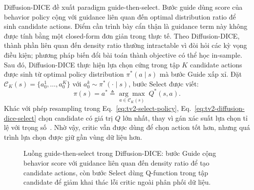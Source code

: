 Diffusion-DICE đề xuất paradigm guide-then-select.
Bước guide dùng score của behavior policy cộng với guidance liên quan đến optimal distribution ratio để sinh candidate actions.
Điểm cần trình bày cẩn thận là guidance term này không được tính bằng một closed-form đơn giản trong thực tế.
Theo Diffusion-DICE, thành phần liên quan đến density ratio thường intractable vì đòi hỏi các kỳ vọng điều kiện; phương pháp biến đổi bài toán thành objective có thể học in-sample.
Sau đó, Diffusion-DICE thực hiện lựa chọn cứng trong tập $K$ candidate actions được sinh từ optimal policy distribution $\pi^*(a\mid s)$ mà bước Guide xấp xỉ.
Đặt $\mathcal{C}_K(s)=\{a_0^1,\ldots,a_0^K\}$ với $a_0^k\sim\pi^*(\cdot\mid s)$, bước Select được viết:
\begin{equation}
    \pi(s)
    =
    a^*
    \triangleq
    \underset{a\in\mathcal{C}_K(s)}{\arg\max}
    \;Q^*(s,a).
    \label{eq:tv2-diffusion-dice-select}
\end{equation}
Khác với phép resampling trong Eq.~\eqref{eq:tv2-select-policy}, Eq.~\eqref{eq:tv2-diffusion-dice-select} chọn candidate có giá trị $Q$ lớn nhất, thay vì gán xác suất lựa chọn tỉ lệ với trọng số~\cite{mao2024diffusiondice}.
Nhờ vậy, critic vẫn được dùng để chọn action tốt hơn, nhưng quá trình lựa chọn được giữ gần vùng dữ liệu hơn.

\begin{figure}[H]
    \centering
    \caption{Luồng guide-then-select trong Diffusion-DICE: bước Guide cộng behavior score với guidance liên quan đến density ratio để tạo candidate actions, còn bước Select dùng Q-function trong tập candidate để giảm khai thác lỗi critic ngoài phân phối dữ liệu.}
    \label{fig:tv2-diffusion-dice-tikz}
\end{figure}

